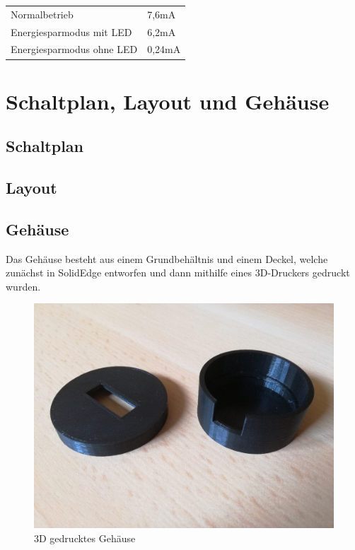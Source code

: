 \documentclass[a4paper,
DIV=13,
12pt,
BCOR=10mm,
department=FakEI,
parskip=half,
automark,
]{article}
\begin{document}
\begin{center}
\begin{tabularx}{\columnwidth}{XX}
Normalbetrieb & 7,6mA \\ 
Energiesparmodus mit LED & 6,2mA\\
Energiesparmodus ohne LED & 0,24mA
\label{tab:ADEinton}
\end{tabularx}
\end{center}





\newpage
\section{Schaltplan, Layout und Gehäuse}
\subsection{Schaltplan}

\subsection{Layout}

\subsection{Gehäuse}
Das Gehäuse besteht aus einem Grundbehältnis und einem Deckel, welche zunächst in SolidEdge entworfen und dann mithilfe eines 3D-Druckers gedruckt wurden.
\begin{figure}[!hbpt]
 \begin{center} \includegraphics[width=1\textwidth]{Gehauuse_Stimmungslicht.jpg}
 \caption{3D gedrucktes Gehäuse}
 \label{fig:Register}
  \end{center}
\end{figure}
\end{document}
